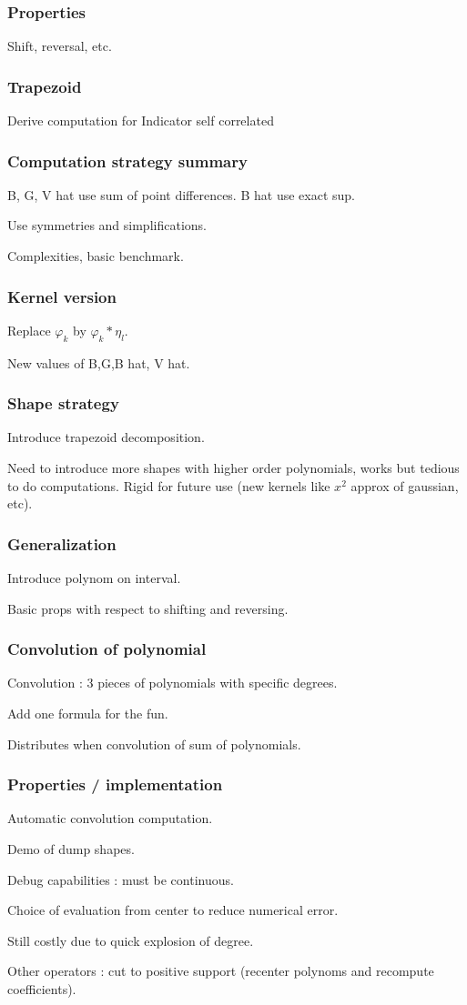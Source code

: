 \documentclass{beamer}
\newcommand\Convolution{\ast}
\begin{document}
\begin{frame}\frametitle{Properties}
    Shift, reversal, etc.
\end{frame}

\begin{frame}\frametitle{Trapezoid}
    Derive computation for Indicator self correlated
\end{frame}

\begin{frame}\frametitle{Computation strategy summary}

    B, G, V hat use sum of point differences.
    B hat use exact sup.

    Use symmetries and simplifications.
    
    Complexities, basic benchmark.

\end{frame}


\begin{frame}\frametitle{Kernel version}
    Replace $\varphi_k$ by $\varphi_k \Convolution \eta_l$.
    
    New values of B,G,B hat, V hat.
\end{frame}

\begin{frame}\frametitle{Shape strategy}
    Introduce trapezoid decomposition.

    Need to introduce more shapes with higher order polynomials, works but tedious to do computations.
    Rigid for future use (new kernels like $x^2$ approx of gaussian, etc).
\end{frame}

\begin{frame}\frametitle{Generalization}
    Introduce polynom on interval.

    Basic props with respect to shifting and reversing.
\end{frame}

\begin{frame}\frametitle{Convolution of polynomial}
    Convolution : 3 pieces of polynomials with specific degrees.

    Add one formula for the fun.

    Distributes when convolution of sum of polynomials.
\end{frame}

\begin{frame}\frametitle{Properties / implementation}
    Automatic convolution computation.

    Demo of dump shapes.

    Debug capabilities : must be continuous.

    Choice of evaluation from center to reduce numerical error.

    Still costly due to quick explosion of degree.

    Other operators : cut to positive support (recenter polynoms and recompute coefficients).
\end{frame}
\end{document}
